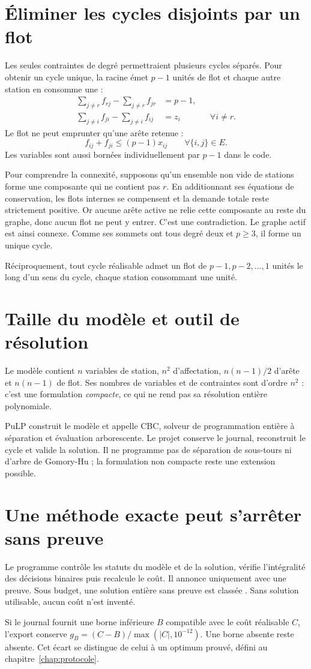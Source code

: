 \section{Éliminer les cycles disjoints par un flot}
Les seules contraintes de degré permettraient plusieurs cycles séparés. Pour
obtenir un cycle unique, la racine émet $p-1$ unités de flot et chaque autre
station en consomme une :
\begin{align}
\sum_{j\ne r}f_{rj}-\sum_{j\ne r}f_{jr}&=p-1,\\
\sum_{j\ne i}f_{ji}-\sum_{j\ne i}f_{ij}&=z_i
   &&\forall i\ne r.
\end{align}
Le flot ne peut emprunter qu'une arête retenue :
\begin{equation}
f_{ij}+f_{ji}\leq(p-1)x_{ij}\qquad\forall\{i,j\}\in E.
\end{equation}
Les variables sont aussi bornées individuellement par $p-1$ dans le code.

Pour comprendre la connexité, supposons qu'un ensemble non vide de stations
forme une composante qui ne contient pas $r$. En additionnant ses équations de
conservation, les flots internes se compensent et la demande totale reste
strictement positive. Or aucune arête active ne relie cette composante au reste
du graphe, donc aucun flot ne peut y entrer. C'est une contradiction.
Le graphe actif est ainsi connexe. Comme ses sommets ont tous degré deux et
$p\geq3$, il forme un unique cycle.

Réciproquement, tout cycle réalisable admet un flot de $p-1,p-2,\ldots,1$
unités le long d'un sens du cycle, chaque station consommant une unité.

\section{Taille du modèle et outil de résolution}
Le modèle contient $n$ variables de station, $n^2$ d'affectation,
$n(n-1)/2$ d'arête et $n(n-1)$ de flot. Ses nombres de variables et de contraintes
sont d'ordre $n^2$ : c'est une formulation \emph{compacte}, ce qui ne rend pas
sa résolution entière polynomiale.

PuLP construit le modèle et appelle CBC, solveur de programmation entière
à séparation et évaluation arborescente\cite{cbc}. Le projet conserve le journal,
reconstruit le cycle et valide la solution. Il ne programme pas de séparation
de sous-tours ni d'arbre de Gomory-Hu ; la formulation non compacte reste
une extension possible.

\section{Une méthode exacte peut s'arrêter sans preuve}
Le programme contrôle les statuts du modèle et de la solution, vérifie
l'intégralité des décisions binaires puis recalcule le coût. Il annonce
 uniquement avec une preuve. Sous budget, une solution entière
sans preuve est classée . Sans solution utilisable,
aucun coût n'est inventé.

Si le journal fournit une borne inférieure $B$ compatible avec le coût
réalisable $C$, l'export conserve $g_B=(C-B)/\max(|C|,10^{-12})$.
Une borne absente reste absente. Cet écart se distingue de celui à un
optimum prouvé, défini au chapitre~\ref{chap:protocole}.
